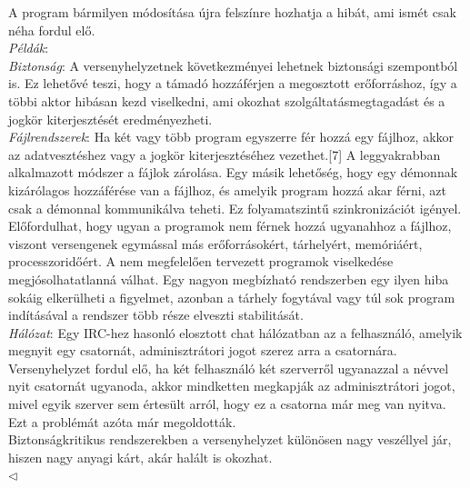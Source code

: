 \documentclass[tikz,12pt,margin=0px]{article}
\begin{document}
    \noindent A program bármilyen módosítása újra felszínre hozhatja a hibát, ami ismét csak néha fordul elő.\\
\newpage
    {\footnotesize \noindent {\color{blue} \faLightbulbO\ $\triangleright$ } }
    {\footnotesize
    \noindent \emph{Példák}:\\

    \noindent \emph{Biztonság}: A versenyhelyzetnek következményei lehetnek biztonsági szempontból is. Ez lehetővé teszi, hogy a támadó hozzáférjen a megosztott erőforráshoz, így a többi aktor hibásan kezd viselkedni, ami okozhat szolgáltatásmegtagadást és a jogkör kiterjesztését eredményezheti.\\

    \noindent \emph{Fájlrendszerek}: Ha két vagy több program egyszerre fér hozzá egy fájlhoz, akkor az adatvesztéshez vagy a jogkör kiterjesztéséhez vezethet.[7] A leggyakrabban alkalmazott módszer a fájlok zárolása. Egy másik lehetőség, hogy egy démonnak kizárólagos hozzáférése van a fájlhoz, és amelyik program hozzá akar férni, azt csak a démonnal kommunikálva teheti. Ez folyamatszintű szinkronizációt igényel.\\

    \noindent Előfordulhat, hogy ugyan a programok nem férnek hozzá ugyanahhoz a fájlhoz, viszont versengenek egymással más erőforrásokért, tárhelyért, memóriáért, processzoridőért. A nem megfelelően tervezett programok viselkedése megjósolhatatlanná válhat. Egy nagyon megbízható rendszerben egy ilyen hiba sokáig elkerülheti a figyelmet, azonban a tárhely fogytával vagy túl sok program indításával a rendszer több része elveszti stabilitását.\\

    \noindent \emph{Hálózat}: Egy IRC-hez hasonló elosztott chat hálózatban az a felhasználó, amelyik megnyit egy csatornát, adminisztrátori jogot szerez arra a csatornára. Versenyhelyzet fordul elő, ha két felhasználó két szerverről ugyanazzal a névvel nyit csatornát ugyanoda, akkor mindketten megkapják az adminisztrátori jogot, mivel egyik szerver sem értesült arról, hogy ez a csatorna már meg van nyitva. Ezt a problémát azóta már megoldották.\\

    \noindent Biztonságkritikus rendszerekben a versenyhelyzet különösen nagy veszéllyel jár, hiszen nagy anyagi kárt, akár halált is okozhat.\\
    $\triangleleft$ \faLightbulbO}\\
	
\end{document}

